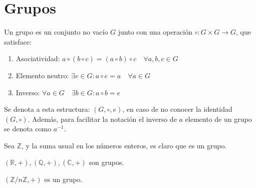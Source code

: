 \section{Grupos}%
\label{sec:Grupos}

\begin{defi}[Grupo]
	Un grupo es un conjunto no vacío $G$ junto con una operación $\circ: G \times G \to G$, que satisface:
	\begin{enumerate}[label=\roman*), font=\normalfont]
		\item Asociatividad: \qquad $a \circ (b \circ c) = (a \circ b) \circ c \quad \forall a, b, c \in G$
		\item Elemento neutro: \qquad $\exists e \in G : a \circ e = a \quad \forall a \in G$
		\item Inverso: \qquad $\forall a \in G \quad \exists b \in G : a \circ b = e$
	\end{enumerate}

\end{defi}

Se denota a esta estructura: $(G, \circ, e)$, en caso de no conocer la identidad $(G, \circ)$. Además, para facilitar la notación el inverso de $a$ elemento de un grupo se denota como $a^{-1}$.

\begin{eje}
	Sea $\mathbb{Z}$, y la suma usual en los números enteros, es claro que es un grupo.
\end{eje}

\begin{eje}
	$(\mathbb{R}, +), (\mathbb{Q}, +), (\mathbb{C}, +)$ son grupos.
\end{eje}

\begin{eje}
	$(\mathbb{Z}/n\mathbb{Z}, +)$ es un grupo.
\end{eje}


